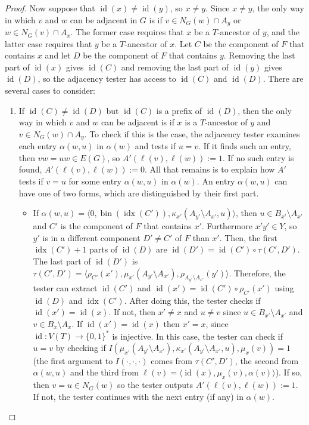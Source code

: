 \documentclass{patmorin}
\DeclareMathOperator{\id}{id}
\DeclareMathOperator{\bin}{bin}
\DeclareMathOperator{\idx}{idx}
\begin{document}
\begin{proof}
  Now suppose that $\id(x)\neq\id(y)$, so $x\neq y$. Since $x\neq y$, the only way in which $v$ and $w$ can be adjacent in $G$ is if $v\in N_G(w)\cap A_y$ or $w\in N_G(v)\cap A_x$.  The former case requires that $x$ be a $T$-ancestor of $y$, and the latter case requires that $y$ be a $T$-ancestor of $x$.  Let $C$ be the component of $F$ that contains $x$ and let $D$ be the component of $F$ that contains $y$.  Removing the last part of $\id(x)$ gives $\id(C)$ and removing the last part of $\id(y)$ gives $\id(D)$, so the adjacency tester has access to $\id(C)$ and $\id(D)$.  There are several cases to consider:
  \begin{enumerate}
    \item If $\id(C)\neq\id(D)$ but $\id(C)$ is a prefix of $\id(D)$, then the only way in which $v$ and $w$ can be adjacent is if $x$ is a $T$-ancestor of $y$ and $v\in N_G(w)\cap A_y$.  To check if this is the case, the adjacency tester 
    examines each entry $\alpha(w,u)$ in $\alpha(w)$ and tests if $u=v$.  If it finds such an entry, then $vw=uw\in E(G)$, so $A'(\ell(v),\ell(w)):=1$. If no such entry is found, $A'(\ell(v),\ell(w)):=0$. All that remains is to explain how $A'$ tests if $v=u$ for some entry $\alpha(w,u)$ in $\alpha(w)$. An entry $\alpha(w,u)$ can have one of two forms, which are distinguished by their first part.
    \begin{itemize}
      \item If $\alpha(w,u)=\langle 0,\bin(\idx(C')), \kappa_{x'}(A_{y'}\setminus A_{x'}, u)\rangle$, then $u\in B_{x'}\setminus A_{x'}$ and $C'$ is the component of $F$ that contains $x'$. Furthermore $x'y'\in Y$, so $y'$ is in a different component $D'\neq C'$ of $F$ than $x'$. Then, the first $\idx(C')+1$ parts of $\id(D)$ are $\id(D')=\id(C')\circ\tau(C',D')$. The last part of $\id(D')$ is $\tau(C',D')=\langle\rho_{C'}(x'),\mu_{x'}(A_{y'}\setminus A_{x'}), \rho_{A_{y'}\setminus A_{x'}}(y')\rangle$.  Therefore, the tester can extract $\id(C')$ and $\id(x')=\id(C')\circ\rho_{C'}(x')$ using $\id(D)$ and $\idx(C')$.  After doing this, the tester checks if $\id(x')=\id(x)$.  If not, then $x'\neq x$ and $u\neq v$ since $u\in B_{x'}\setminus A_{x'}$ and $v\in B_x\setminus A_x$. If $\id(x')=\id(x)$ then $x'=x$, since $\id:V(T)\to\{0,1\}^*$ is injective.  In this case, the tester can check if $u=v$ by checking if $I(\mu_{x'}(A_{y'}\setminus A_{x'}),\kappa_{x'}(A_{y'}\setminus A_{x'}, u), \mu_{x}(v))=1$ (the first argument to $I(\cdot,\cdot,\cdot)$ comes from $\tau(C',D')$, the second from $\alpha(w,u)$ and the third from $\ell(v)=\langle\id(x),\mu_x(v),\alpha(v)\rangle$).  If so, then $v=u\in N_G(w)$ so the tester outputs $A'(\ell(v),\ell(w)):=1$.  If not, the tester continues with the next entry (if any) in $\alpha(w)$.
      

\end{itemize}
\end{enumerate}
\end{proof}
\end{document}

